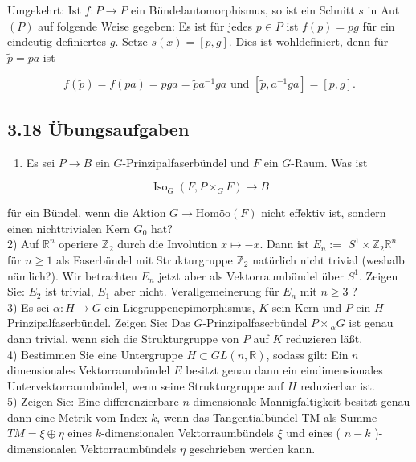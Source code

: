\documentclass[10pt, letterpaper]{article}
\begin{document}
Umgekehrt: Ist $f: P \rightarrow P$ ein Bündelautomorphismus, so ist ein Schnitt $s$ in Aut $(P)$ auf folgende Weise gegeben: Es ist für jedes $p \in P$ ist $f(p)=p g$ für ein eindeutig definiertes $g$. Setze $s(x)=[p, g]$. Dies ist wohldefiniert, denn für $\tilde{p}=p a$ ist

$$
f(\tilde{p})=f(p a)=p g a=\tilde{p} a^{-1} g a \text { und }\left[\tilde{p}, a^{-1} g a\right]=[p, g] .
$$

\subsection*{3.18 Übungsaufgaben}
\begin{enumerate}
  \item Es sei $P \rightarrow B$ ein $G$-Prinzipalfaserbündel und $F$ ein $G$-Raum. Was ist
\end{enumerate}

$$
\operatorname{Iso}_{G}\left(F, P \times_{G} F\right) \rightarrow B
$$

für ein Bündel, wenn die Aktion $G \rightarrow \text{Homöo}(F)$ nicht effektiv ist, sondern einen nichttrivialen Kern $G_{0}$ hat?\\
2) Auf $\mathbb{R}^{n}$ operiere $\mathbb{Z}_{2}$ durch die Involution $x \mapsto-x$. Dann ist $E_{n}:=$ $S^{1} \times \mathbb{Z}_{2} \mathbb{R}^{n}$ für $n \geq 1$ als Faserbündel mit Strukturgruppe $\mathbb{Z}_{2}$ natürlich nicht trivial (weshalb nämlich?). Wir betrachten $E_{n}$ jetzt aber als Vektorraumbündel über $S^{1}$. Zeigen Sie: $E_{2}$ ist trivial, $E_{1}$ aber nicht. Verallgemeinerung für $E_{n}$ mit $n \geq 3$ ?\\
3) Es sei $\alpha: H \rightarrow G$ ein Liegruppenepimorphismus, $K$ sein Kern und $P$ ein $H$-Prinzipalfaserbündel. Zeigen Sie: Das $G$-Prinzipalfaserbündel $P \times{ }_{\alpha} G$ ist genau dann trivial, wenn sich die Strukturgruppe von $P$ auf $K$ reduzieren läßt.\\
4) Bestimmen Sie eine Untergruppe $H \subset G L(n, \mathbb{R})$, sodass gilt: Ein $n$ dimensionales Vektorraumbündel $E$ besitzt genau dann ein eindimensionales Untervektorraumbündel, wenn seine Strukturgruppe auf $H$ reduzierbar ist.\\
5) Zeigen Sie: Eine differenzierbare $n$-dimensionale Mannigfaltigkeit besitzt genau dann eine Metrik vom Index $k$, wenn das Tangentialbündel TM als Summe $T M=\xi \oplus \eta$ eines $k$-dimensionalen Vektorraumbündels $\xi$ und eines ( $n-k$ )-dimensionalen Vektorraumbündels $\eta$ geschrieben werden kann.
\end{document}
